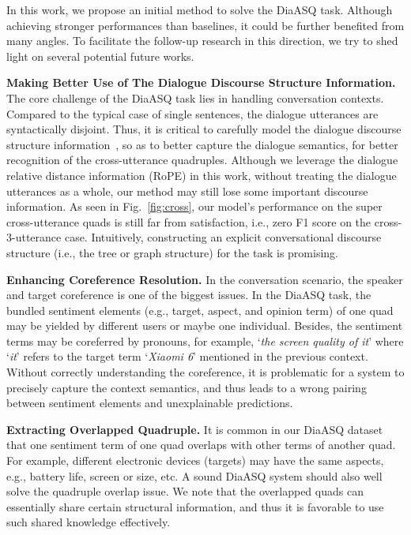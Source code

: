 \documentclass[11pt]{article}
\begin{document}
\vspace{-1mm}
In this work, we propose an initial method to solve the DiaASQ task.
Although achieving stronger performances than baselines, it could be further benefited from many angles.
To facilitate the follow-up research in this direction, we try to shed light on several potential future works.

\vspace{4pt}
\noindent \textbf{Making Better Use of The Dialogue Discourse Structure Information.}
The core challenge of the DiaASQ task lies in handling conversation contexts.
Compared to the typical case of single sentences, the dialogue utterances are syntactically disjoint.
Thus, it is critical to carefully model the dialogue discourse structure information~\cite{FeiDiaREIJCAI22}, so as to better capture the dialogue semantics, for better recognition of the cross-utterance quadruples.
Although we leverage the dialogue relative distance information (RoPE) in this work, without treating the dialogue utterances as a whole, our method may still lose some important discourse information.
As seen in Fig.~\ref{fig:cross}, our model's performance on the super cross-utterance quads is still far from satisfaction, i.e., zero F1 score on the cross-3-utterance case. 
Intuitively, constructing an explicit conversational discourse structure (i.e., the tree or graph structure) for the task is promising.

\vspace{4pt}
\noindent \textbf{Enhancing Coreference Resolution.}
In the conversation scenario, the speaker and target coreference is one of the biggest issues.
In the DiaASQ task, the bundled sentiment elements (e.g., target, aspect, and opinion term) of one quad may be yielded by different users or maybe one individual.
Besides, the sentiment terms may be coreferred by pronouns, for example, `\emph{the screen quality of it}' where `\emph{it}' refers to the target term `\emph{Xiaomi 6}' mentioned in the previous context.
Without correctly understanding the coreference, it is problematic for a system to precisely capture the context semantics, and thus leads to a wrong pairing between sentiment elements and unexplainable predictions.

\vspace{4pt}
\noindent \textbf{Extracting Overlapped Quadruple.}
It is common in our DiaASQ dataset that one sentiment term of one quad overlaps with other terms of another quad.
For example, different electronic devices (targets) may have the same aspects, e.g., battery life, screen or size, etc.
A sound DiaASQ system should also well solve the quadruple overlap issue.
We note that the overlapped quads can essentially share certain structural information, and thus it is favorable to use such shared knowledge effectively.
\end{document}
